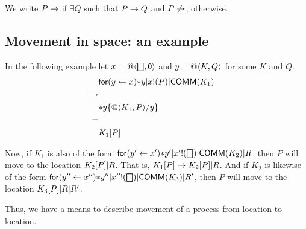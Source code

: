 
We write $P\red$ if $\exists Q $ such that $ P \red Q$ and $P\not\red$, otherwise.

\subsection{ Movement in space: an example }
In the following example let $x = \spacen{\bigbox}{\pzero}$ and $y = \spacen{K}{Q}$ for some $K$ and $Q$.
\begin{eqnarray*}
  & \binpar{\binpar{\prefix{x}{y}{\dropn{y}}}{\outputp{x}{P}}}{\mathsf{COMM}(K_{1})} & \\
  \red & & \\
  & \dropn{y}\substn{\spacen{K_{1}}{P}}{y} & \\
  = & & \\
  & K_{1}[P] &
\end{eqnarray*}

Now, if $K_{1}$ is also of the form $\binpar{\binpar{\binpar{\prefix{x'}{y'}{\dropn{y'}}}{\outputp{x'}{\bigbox}}}{\mathsf{COMM}(K_{2})}}{R}$, then $P$ will move to the location $\binpar{K_{2}[P]}{R}$. That is, $K_{1}[P] \red \binpar{K_{2}[P]}{R}$. And if $K_{2}$ is likewise of the form $\binpar{\binpar{\binpar{\prefix{x''}{y''}{\dropn{y''}}}{\outputp{x''}{\bigbox}}}{\mathsf{COMM}(K_{3})}}{R'}$, then $P$ will move to the location $\binpar{K_{3}[P]}{\binpar{R}{R'}}$.

Thus, we have a means to describe movement of a process from location to location.
